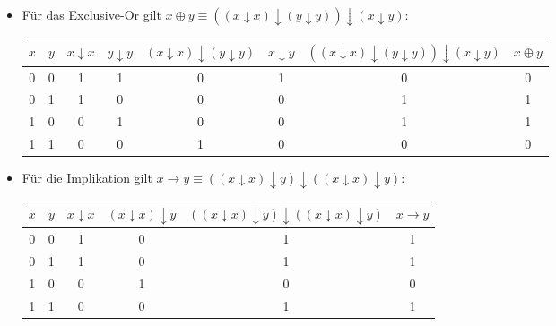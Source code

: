 \documentclass[a4paper,10pt]{article}
\begin{document}
\begin{enumerate}
\begin{itemize}
\item Für das Exclusive-Or gilt $x \oplus y \equiv ((x \downarrow x) \downarrow (y \downarrow y)) \downarrow (x \downarrow y)$: \\
\begin{tabular}{|c|c|c|c|c|c|c|c|}
\hline 
\rule[-1ex]{0pt}{2.5ex} $x$ & $y$ & $x \downarrow x$ & $y \downarrow y$ & $(x \downarrow x) \downarrow (y \downarrow y)$ & $x \downarrow y$ & $((x \downarrow x) \downarrow (y \downarrow y)) \downarrow (x \downarrow y)$ & $x \oplus y$\\ 
\hline 
\rule[-1ex]{0pt}{2.5ex} 0 & 0 & 1 & 1 & 0 & 1 & 0 & 0 \\ 
\hline 
\rule[-1ex]{0pt}{2.5ex} 0 & 1 & 1 & 0 & 0 & 0 & 1 & 1\\ 
\hline 
\rule[-1ex]{0pt}{2.5ex} 1 & 0 & 0 & 1 & 0 & 0 & 1 & 1\\ 
\hline 
\rule[-1ex]{0pt}{2.5ex} 1 & 1 & 0 & 0 & 1 & 0 & 0 & 0\\ 
\hline
\end{tabular}

\item Für die Implikation gilt $x \rightarrow y \equiv ((x \downarrow x) \downarrow y) \downarrow ((x \downarrow x) \downarrow y)$: \\
\begin{tabular}{|c|c|c|c|c|c|}
\hline 
\rule[-1ex]{0pt}{2.5ex} $x$ & $y$ & $x \downarrow x$ & $(x \downarrow x) \downarrow y$ & $((x \downarrow x) \downarrow y) \downarrow ((x \downarrow x) \downarrow y)$ & $x \rightarrow y$ \\ 
\hline 
\rule[-1ex]{0pt}{2.5ex} 0 & 0 & 1 & 0 & 1 & 1 \\ 
\hline 
\rule[-1ex]{0pt}{2.5ex} 0 & 1 & 1 & 0 & 1 & 1\\ 
\hline 
\rule[-1ex]{0pt}{2.5ex} 1 & 0 & 0 & 1 & 0 & 0\\ 
\hline 
\rule[-1ex]{0pt}{2.5ex} 1 & 1 & 0 & 0 & 1 & 1\\ 
\hline
\end{tabular}


\end{itemize}
\end{enumerate}
\end{document}
